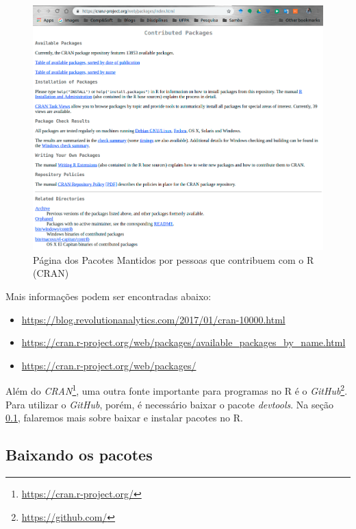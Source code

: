 \documentclass[12pt,a4paper,oneside]{erdc}
\begin{document}
\begin{figure}
	\centering
	\includegraphics[width=\linewidth]{../figs/BP_Curso_TecComp_00_2019_f01-10.png}
	\caption{Página dos Pacotes Mantidos por pessoas que contribuem com o R (CRAN)}
	\label{fig:bpcursoteccomp002019f01-10}
\end{figure}


Mais informações podem ser encontradas abaixo:
\begin{itemize}
	\item \url{https://blog.revolutionanalytics.com/2017/01/cran-10000.html}
	
	\item \url{https://cran.r-project.org/web/packages/available_packages_by_name.html}
	
	\item \url{https://cran.r-project.org/web/packages/}
	
\end{itemize}


Além do \textit{CRAN}\footnote{\url{https://cran.r-project.org/}}, uma outra fonte importante para programas no R é o \textit{GitHub}\footnote{\url{https://github.com/}}. Para utilizar o \textit{GitHub}, porém, é necessário baixar o pacote \textit{devtools}. Na seção \ref{section:baixandoPacotes}, falaremos mais sobre baixar e instalar pacotes no R.



\subsection{Baixando os pacotes}
\label{section:baixandoPacotes}
\end{document}
